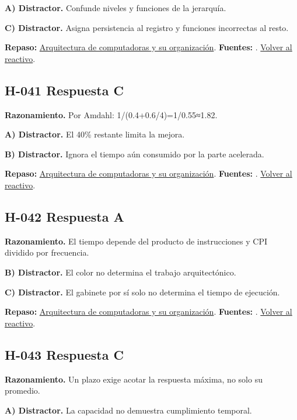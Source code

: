 \textbf{A) Distractor. }Confunde niveles y funciones de la jerarquía.

\textbf{C) Distractor. }Asigna persistencia al registro y funciones incorrectas al resto.

\textbf{Repaso:} \hyperref[sec:h2]{Arquitectura de computadoras y su organización}. \textbf{Fuentes:} \cite{intel,architecture}. \hyperref[q:H-040]{Volver al reactivo}.\par\medskip

\subsection*{H-041 \quad Respuesta C}\label{s:H-041}
\textbf{Razonamiento.} Por Amdahl: 1/(0.4+0.6/4)=1/0.55≈1.82.

\textbf{A) Distractor. }El 40\% restante limita la mejora.

\textbf{B) Distractor. }Ignora el tiempo aún consumido por la parte acelerada.

\textbf{Repaso:} \hyperref[sec:h2]{Arquitectura de computadoras y su organización}. \textbf{Fuentes:} \cite{intel,architecture}. \hyperref[q:H-041]{Volver al reactivo}.\par\medskip

\subsection*{H-042 \quad Respuesta A}\label{s:H-042}
\textbf{Razonamiento.} El tiempo depende del producto de instrucciones y CPI dividido por frecuencia.

\textbf{B) Distractor. }El color no determina el trabajo arquitectónico.

\textbf{C) Distractor. }El gabinete por sí solo no determina el tiempo de ejecución.

\textbf{Repaso:} \hyperref[sec:h2]{Arquitectura de computadoras y su organización}. \textbf{Fuentes:} \cite{intel,architecture}. \hyperref[q:H-042]{Volver al reactivo}.\par\medskip

\subsection*{H-043 \quad Respuesta C}\label{s:H-043}
\textbf{Razonamiento.} Un plazo exige acotar la respuesta máxima, no solo su promedio.

\textbf{A) Distractor. }La capacidad no demuestra cumplimiento temporal.

